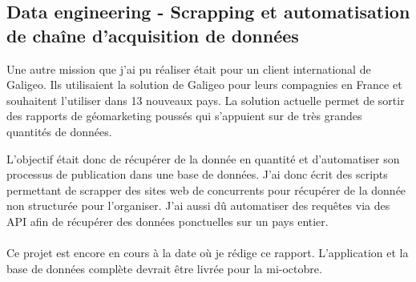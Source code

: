 \subsection{Data engineering - Scrapping et automatisation de chaîne d'acquisition de données}

Une autre mission que j’ai pu réaliser était pour un client international de Galigeo. Ils utilisaient la solution de Galigeo pour leurs compagnies en France et souhaitent l’utiliser dans 13 nouveaux pays. La solution actuelle permet de sortir des rapports de géomarketing poussés qui s’appuient sur de très grandes quantités de données.

L’objectif était donc de récupérer de la donnée en quantité et d’automatiser son processus de publication dans une base de données. J’ai donc écrit des scripts permettant de scrapper des sites web de concurrents pour récupérer de la donnée non structurée pour l’organiser. J’ai aussi dû automatiser des requêtes via des API afin de récupérer des données ponctuelles sur un pays entier.

\paragraph*{}

Ce projet est encore en cours à la date où je rédige ce rapport. L’application et la base de données complète devrait être livrée pour la mi-octobre.

